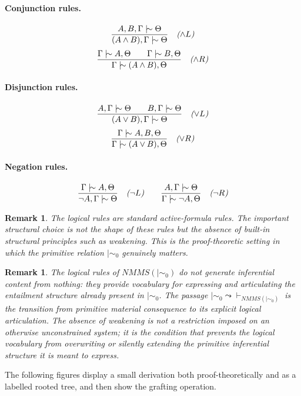 \documentclass[11pt]{article}
\newtheorem{remark}[theorem]{Remark}
\newcommand{\ms}{\mathrel{\mid\!\sim}}
\newcommand{\mszero}{\mathrel{\mid\!\sim_{0}}}
\newcommand{\NMMS}{\mathit{NMMS}}
\begin{document}
\paragraph{Conjunction rules.}
\[
\frac{A,B,\Gamma \ms \Theta}
{(A\wedge B),\Gamma \ms \Theta}
\quad \text{\emph{(\(\wedge L\))}}
\]
\[
\frac{\Gamma \ms A,\Theta \qquad \Gamma \ms B,\Theta}
{\Gamma \ms (A\wedge B),\Theta}
\quad \text{\emph{(\(\wedge R\))}}
\]

\paragraph{Disjunction rules.}
\[
\frac{A,\Gamma \ms \Theta \qquad B,\Gamma \ms \Theta}
{(A\vee B),\Gamma \ms \Theta}
\quad \text{\emph{(\(\vee L\))}}
\]
\[
\frac{\Gamma \ms A,B,\Theta}
{\Gamma \ms (A\vee B),\Theta}
\quad \text{\emph{(\(\vee R\))}}
\]

\paragraph{Negation rules.}
\[
\frac{\Gamma \ms A,\Theta}
{\neg A,\Gamma \ms \Theta}
\quad \text{\emph{(\(\neg L\))}}
\qquad
\frac{A,\Gamma \ms \Theta}
{\Gamma \ms \neg A,\Theta}
\quad \text{\emph{(\(\neg R\))}}
\]

\begin{remark}
The logical rules are standard active-formula rules. The important structural
choice is not the shape of these rules but the absence of built-in structural
principles such as weakening. This is the proof-theoretic setting in which the
primitive relation \(\mszero\) genuinely matters.
\end{remark}

\begin{remark}
The logical rules of \(\NMMS(\mszero)\) do not generate inferential content
from nothing: they provide vocabulary for expressing and articulating the
entailment structure already present in \(\mszero\). The passage
\(\mszero \leadsto \vdash_{\NMMS(\mszero)}\) is the transition from
primitive material consequence to its explicit logical articulation.
The absence of weakening is not a restriction imposed on an otherwise
unconstrained system; it is the condition that prevents the logical
vocabulary from overwriting or silently extending the primitive
inferential structure it is meant to express.
\end{remark}

\noindent The following figures display a small derivation both proof-theoretically and as a labelled rooted tree, and then show the grafting operation.
\end{document}
